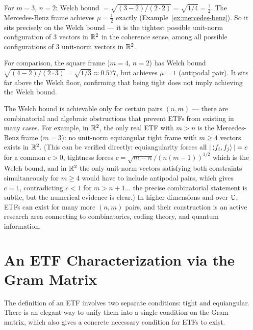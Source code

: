 \begin{examplebox}[title={Example 9.2: Welch bound for the Mercedes-Benz frame}]
\label{ex:welch-mercedes}
For $m=3$, $n=2$: Welch bound $= \sqrt{(3-2)/(2\cdot2)} = \sqrt{1/4}
= \tfrac12$. The Mercedes-Benz frame achieves $\mu=\tfrac12$ exactly
(Example~\ref{ex:mercedes-benz}). So it sits precisely on the Welch
bound --- it is the tightest possible unit-norm configuration of $3$
vectors in $\mathbb{R}^2$ in the coherence sense, among all possible
configurations of $3$ unit-norm vectors in $\mathbb{R}^2$.

For comparison, the square frame ($m=4$, $n=2$) has Welch bound
$\sqrt{(4-2)/(2\cdot3)} = \sqrt{1/3} \approx 0.577$, but achieves
$\mu=1$ (antipodal pair). It sits far above the Welch floor, confirming
that being tight does not imply achieving the Welch bound.
\end{examplebox}

\begin{remark*}
The Welch bound is achievable only for certain pairs $(n,m)$ --- there
are combinatorial and algebraic obstructions that prevent ETFs from
existing in many cases. For example, in $\mathbb{R}^2$, the only real ETF with
$m>n$ is the Mercedes-Benz frame ($m=3$): no unit-norm equiangular tight
frame with $m\ge4$ vectors exists in $\mathbb{R}^2$. (This can be verified
directly: equiangularity forces all $|\left\langle f_i, f_j \right\rangle|=c$ for a common
$c>0$, tightness forces $c=\sqrt{m-n}/(n(m-1))^{1/2}$ which is the
Welch bound, and in $\mathbb{R}^2$ the only unit-norm vectors satisfying both
constraints simultaneously for $m\ge4$ would have to include antipodal
pairs, which gives $c=1$, contradicting $c<1$ for $m>n+1$... the precise
combinatorial statement is subtle, but the numerical evidence is clear.)
In higher dimensions and over $\mathbb{C}$, ETFs can exist for many more
$(n,m)$ pairs, and their construction is an active research area
connecting to combinatorics, coding theory, and quantum information.
\end{remark*}

\section{An ETF Characterization via the Gram Matrix}
\label{sec:gram-characterization}

The definition of an ETF involves two separate conditions: tight and
equiangular. There is an elegant way to unify them into a single
condition on the Gram matrix, which also gives a concrete necessary
condition for ETFs to exist.

